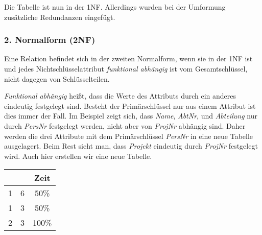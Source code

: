 \documentclass[9pt,a4paper]{arbeitsblatt}
\begin{document}
Die Tabelle ist nun in der 1NF. Allerdings wurden bei der Umformung zusätzliche
Redundanzen eingefügt.

\begin{infobox}\vspace*{-1em}
	\subsubsection*{2. Normalform (2NF)}

	Eine Relation befindet sich in der zweiten Normalform, wenn sie in der 1NF ist
	und jedes Nichtschlüsselattribut \emph{funktional abhängig} ist vom
	Gesamtschlüssel, nicht dagegen von Schlüsselteilen.
\end{infobox}

\emph{Funktional abhängig} heißt, dass die Werte des Attributs durch ein anderes
eindeutig festgelegt sind. Besteht der Primärschlüssel nur aus einem Attribut
ist dies immer der Fall. Im Beispiel zeigt sich, dass \emph{Name},
\emph{AbtNr}, und \emph{Abteilung} nur durch
\emph{PersNr} festgelegt werden, nicht aber von \emph{ProjNr}
abhängig sind. Daher werden die drei Attribute mit dem Primärschlüssel
\emph{PersNr} in eine neue Tabelle ausgelagert. Beim Rest sieht man,
dass \emph{Projekt} eindeutig durch \emph{ProjNr} festgelegt
wird. Auch hier erstellen wir eine neue Tabelle.

\begin{center}
	\begin{tabular}{|c|c|c|}\hline
		\rowcolor{ab.tabelle.kopf.hg}
		\fpkey{PersNr} & \fpkey{ProjNr} & Zeit  \\\hline
		1              & 6              & 50\%  \\\hline
		1              & 3              & 50\%  \\\hline
		2              & 3              & 100\% \\\hline
	\end{tabular}
\end{center}
\end{document}
